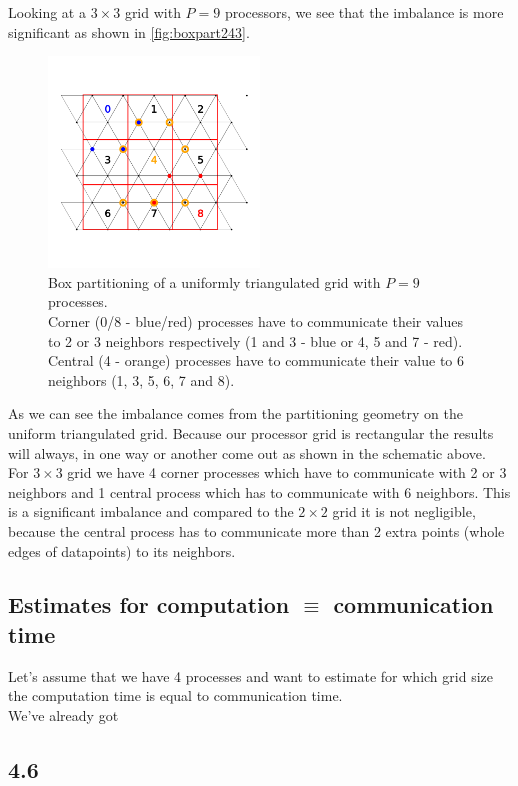 Looking at a $3\times3$ grid with $P=9$ processors, we see that the imbalance is more significant as shown in \autoref{fig:boxpart243}.\\
\begin{figure}[H]
    \centering
    \includegraphics[width=0.5\textwidth]{../fig/lab2/grid_3x3_partition.png}
    \caption{Box partitioning of a uniformly triangulated grid with $P=9$ processes.\\
    Corner (0/8 - blue/red) processes have to communicate their values to 2 or 3 neighbors respectively (1 and 3 - blue or 4, 5 and 7 - red).\\
    Central (4 - orange) processes have to communicate their value to 6 neighbors (1, 3, 5, 6, 7 and 8).}
    \label{fig:boxpart243}
\end{figure}
As we can see the imbalance comes from the partitioning geometry on the uniform triangulated grid. Because our processor grid is rectangular the results will always, in one way or another come out as shown in the schematic above.\\
For $3\times3$ grid we have 4 corner processes which have to communicate with 2 or 3 neighbors and 1 central process which has to communicate with 6 neighbors. This is a significant imbalance and compared to the $2\times2$ grid it is not negligible, because the central process has to communicate more than 2 extra points (whole edges of datapoints) to its neighbors.\\
\subsection{Estimates for computation $\equiv$ communication time}
Let's assume that we have 4 processes and want to estimate for which grid size the computation time is equal to communication time. \\
We've already got 
\subsection{4.6}
